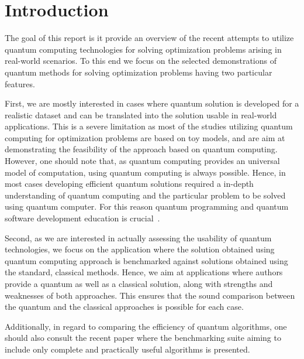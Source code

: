 \documentclass[a4paper,11pt]{article}
\newcommand{\docName}{report\xspace}
\begin{document}
\tableofcontents

%

\newpage

\section{Introduction}

The goal of this \docName is it provide an overview of the recent attempts to utilize quantum computing technologies for solving optimization problems arising in real-world scenarios. To this end we focus on the selected demonstrations of quantum methods for solving optimization problems having two particular features.

First, we are mostly interested in cases where quantum solution is developed for a realistic dataset and can be translated into the solution usable in real-world applications. This is a severe limitation as most of the studies utilizing quantum computing for optimization problems are based on toy models, and are aim at demonstrating the feasibility of the approach based on quantum computing. However, one should note that, as quantum computing provides an universal model of computation, using quantum computing is always possible. Hence, in most cases developing efficient quantum solutions required a in-depth understanding of quantum computing and the particular problem to be solved using quantum computer. For this reason quantum programming and quantum software development education is crucial~\cite{salehi2022computer}.

Second, as we are interested in actually assessing the usability of quantum technologies, we focus on the application where the solution obtained using quantum computing approach is benchmarked against solutions obtained using the standard, classical methods. Hence, we aim at applications where authors provide a quantum as well as a classical solution, along with strengths and weaknesses of both approaches. This ensures that the sound comparison between the quantum and the classical approaches is possible for each case. 


Additionally, in regard to comparing the efficiency of quantum algorithms, one should also consult the recent paper \cite{lubinski2023application} where the benchmarking suite aiming to include only complete and practically useful algorithms is presented.
\end{document}
